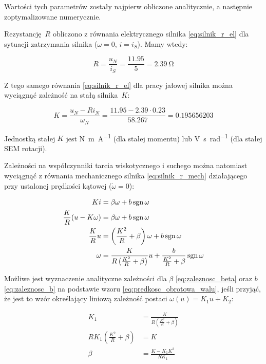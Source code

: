 Wartości tych parametrów zostały najpierw obliczone analitycznie, a następnie zoptymalizowane numerycznie.

Rezystancję $R$ obliczono z równania elektrycznego silnika \eqref{eq:silnik_r_el} dla sytuacji zatrzymania silnika ($\omega = 0$, $i = i_S$). Mamy wtedy:

\begin{equation}
    R = \frac{u_N}{i_S} = \frac{\num{11,95}}{\num{5}} = \SI{2,39}{\ohm}
\end{equation}

Z tego samego równania \eqref{eq:silnik_r_el} dla pracy jałowej silnika można wyciągnąć zależność na stałą silnika~$K$:

\begin{equation}
    K = \frac{u_N - R i_N}{\omega_N} = \frac{\num{11,95} - \num{2,39} \cdot \num{0,23}}{\num{58,267}} = \num{0,195656203}
\end{equation}

Jednostką stałej $K$ jest \si[per-mode=fraction]{\newton\meter\per\ampere} (dla stałej momentu) lub \si[per-mode=fraction]{\volt\second\per\radian} (dla stałej SEM rotacji).

Zależności na współczynniki tarcia wiskotycznego i suchego można natomiast wyciągnąć z równania mechanicznego silnika \eqref{eq:silnik_r_mech} działającego przy ustalonej prędkości kątowej ($\dot{\omega} = 0$):

\begin{align}
    K i &= \beta \omega + b \operatorname{sgn} \omega \nonumber \\
    \frac{K}{R} (u - K \omega) &= \beta \omega + b \operatorname{sgn} \omega \nonumber \\
    \frac{K}{R} u &= \left(\frac{K^2}{R} + \beta \right) \omega + b \operatorname{sgn} \omega \nonumber \\
    \omega &= \frac{K}{R \left(\frac{K^2}{R} + \beta \right)} u + \frac{b}{\frac{K^2}{R} + \beta} \operatorname{sgn} \omega \label{eq:predkosc_obrotowa_walu}
\end{align}

Możliwe jest wyznaczenie analityczne zależności dla $\beta$ \eqref{eq:zaleznosc_beta} oraz $b$ \eqref{eq:zaleznosc_b} na podstawie wzoru \eqref{eq:predkosc_obrotowa_walu}, jeśli przyjąć, że jest to wzór określający liniową zależność postaci $\omega(u) = K_1 u + K_2$:

\begin{align}
    K_1 &= \frac{K}{R \left(\frac{K^2}{R} + \beta \right)} \nonumber \\
    R K_1 \left(\frac{K^2}{R} + \beta \right) &= K \nonumber \\
    \beta &= \frac{K - K_1 K^2}{R K_1} \label{eq:zaleznosc_beta}
\end{align}

